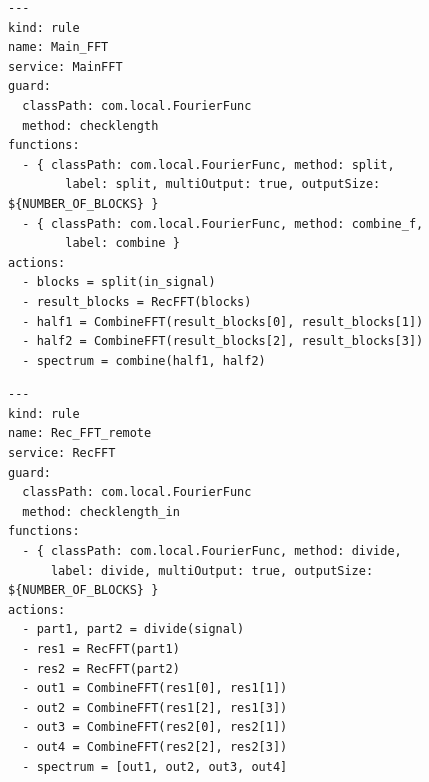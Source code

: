 \begin{lstlisting}[caption={Production du service MainFFT}, label={lst:main_pdtion}]
---
kind: rule
name: Main_FFT
service: MainFFT
guard:
  classPath: com.local.FourierFunc
  method: checklength
functions:
  - { classPath: com.local.FourierFunc, method: split,
        label: split, multiOutput: true, outputSize: ${NUMBER_OF_BLOCKS} }
  - { classPath: com.local.FourierFunc, method: combine_f,
        label: combine }
actions:
  - blocks = split(in_signal)
  - result_blocks = RecFFT(blocks)
  - half1 = CombineFFT(result_blocks[0], result_blocks[1])
  - half2 = CombineFFT(result_blocks[2], result_blocks[3])
  - spectrum = combine(half1, half2)
\end{lstlisting}

\begin{lstlisting}[caption={Une des productions du service RecFFT}]
---
kind: rule
name: Rec_FFT_remote
service: RecFFT
guard:
  classPath: com.local.FourierFunc
  method: checklength_in
functions:
  - { classPath: com.local.FourierFunc, method: divide, 
      label: divide, multiOutput: true, outputSize: ${NUMBER_OF_BLOCKS} }
actions:
  - part1, part2 = divide(signal)
  - res1 = RecFFT(part1)
  - res2 = RecFFT(part2)
  - out1 = CombineFFT(res1[0], res1[1])
  - out2 = CombineFFT(res1[2], res1[3])
  - out3 = CombineFFT(res2[0], res2[1])
  - out4 = CombineFFT(res2[2], res2[3])
  - spectrum = [out1, out2, out3, out4]
\end{lstlisting}

